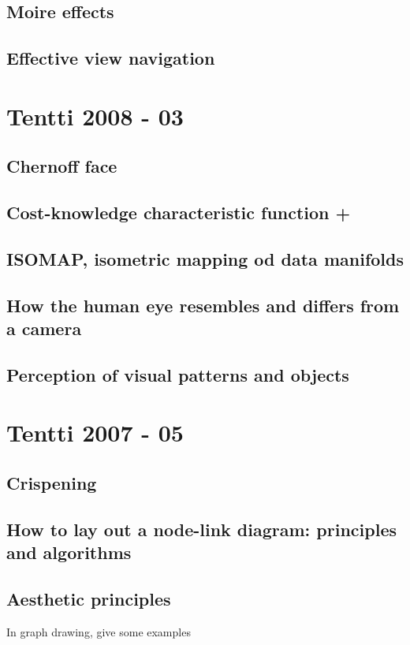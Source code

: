 \documentclass[a4paper]{article}
\begin{document}
\subsection{Moire effects}

\subsection{Effective view navigation}

\section{Tentti 2008 - 03}

\subsection{Chernoff face}

\subsection{Cost-knowledge characteristic function +}

\subsection{ISOMAP, isometric mapping od data manifolds}

\subsection{How the human eye resembles and differs from a camera}

\subsection{Perception of visual patterns and objects}

\section{Tentti 2007 - 05}

\subsection{Crispening}

\subsection{How to lay out a node-link diagram: principles and algorithms}

\subsection{Aesthetic principles}

In graph drawing, give some examples
\end{document}
